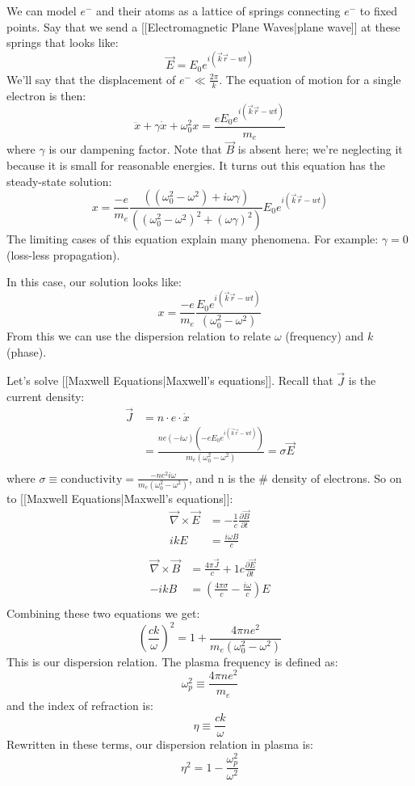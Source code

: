 \documentclass{article}
\def\wz{\omega_0}
\def\dce{\vec\tr\times\vec E}
\def\dcb{\vec\tr\times\vec B}
\def\tr{\nabla}
\def\ef{\vec E}
\def\tr{\nabla}
\def\dce{\vec\tr\times\vec E}
\def\dcb{\vec\tr\times\vec B}
\def\wz{\omega_0}
\def\ef{\vec E}
\def\bfield{{\vec B}}
\begin{document}
We can model $e^-$ and their atoms as a lattice of springs connecting $e^-$
to fixed points.  Say that we send a [[Electromagnetic Plane Waves|plane wave]] at these springs that
looks like:
\def\eikrwt{e^{i(\vec k\vec r-wt)}}
$$\ef=E_0\eikrwt$$
We'll say that the displacement of $e^-\ll\frac{2\pi}{ k}$.  The equation of
motion for a single electron is then:
$$\ddot x+\gamma\dot x+\wz^2x=\frac{eE_0\eikrwt}{ m_e}$$
where $\gamma$ is our dampening factor.  Note that $\bfield$ is absent 
here; we're neglecting it because it is small for
reasonable energies. It turns out this
equation has the steady-state solution:
$$x=\frac{-e}{ m_e}\frac{\left((\wz^2-\omega^2)+i\omega\gamma\right)}{
\left((\wz^2-\omega^2)^2+(\omega\gamma)^2\right)}E_0\eikrwt$$
The limiting cases of this equation explain many phenomena.  For example:
$\gamma=0$ (loss-less propagation).\par
In this case, our solution looks like:
$$x=\frac{-e}{ m_e}\frac{E_0\eikrwt}{(\wz^2-\omega^2)}$$
From this we can use the dispersion relation to relate $\omega$ (frequency) and
$k$ (phase).

Let's solve [[Maxwell Equations|Maxwell's equations]].  Recall that $\vec J$ is the current density:
$$\begin{aligned}\vec J&=n\cdot e\cdot\dot x\\ 
&=\frac{ne(-i\omega)(-eE_0\eikrwt)}{ m_e(\wz^2-\omega^2)}=\sigma\ef\\ \end{aligned}$$
where $\sigma\equiv \text{conductivity}=\frac{-ne^2i\omega}{ m_e(\wz^2-\omega^2)}$, and
n is the \# density of electrons.
So on to [[Maxwell Equations|Maxwell's equations]]:
$$\begin{aligned}\dce&=-\frac{1}{ c}\frac{\partial\bfield}{\partial t}\\ 
ikE&=\frac{i\omega B}{ c}\\ \end{aligned}$$
$$\begin{aligned}\dcb&=\frac{4\pi\vec J}{ c}+{1}{ c}\frac{\partial\ef}{\partial t}\\ 
-ikB&=\left(\frac{4\pi\sigma}{ c}-\frac{i\omega}{ c}\right)E\\ \end{aligned}$$
Combining these two equations we get:
$$\boxed{\left(\frac{ck}{\omega}\right)^2=1+\frac{4\pi ne^2}{ 
m_e(\wz^2-\omega^2)}}$$
This is our dispersion relation.  The plasma frequency is defined as:
$$\omega_p^2\equiv \frac{4\pi ne^2}{ m_e}$$
and the index of refraction is:
$$\eta\equiv\frac{ck}{\omega}$$
Rewritten in these terms, our dispersion relation in plasma is:
$$\boxed{\eta^2=1-\frac{\omega_p^2}{\omega^2}}$$
\end{document}
